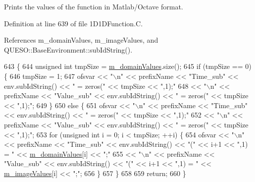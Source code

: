 Prints the values of the function in Matlab/\-Octave format. 



Definition at line 639 of file 1\-D1\-D\-Function.\-C.



References m\-\_\-domain\-Values, m\-\_\-image\-Values, and Q\-U\-E\-S\-O\-::\-Base\-Environment\-::sub\-Id\-String().


\begin{DoxyCode}
643 \{
644   \textcolor{keywordtype}{unsigned} \textcolor{keywordtype}{int} tmpSize = \hyperlink{class_q_u_e_s_o_1_1_sampled1_d1_d_function_a6985db1a50a72a3fb1377645ac6cd944}{m\_domainValues}.size();
645   \textcolor{keywordflow}{if} (tmpSize == 0) \{
646     tmpSize = 1;
647     ofsvar << \textcolor{stringliteral}{"\(\backslash\)n"} << prefixName << \textcolor{stringliteral}{"Time\_sub"} << env.subIdString() << \textcolor{stringliteral}{" = zeros("}  << tmpSize << \textcolor{stringliteral}{",1);"}
648            << \textcolor{stringliteral}{"\(\backslash\)n"} << prefixName << \textcolor{stringliteral}{"Value\_sub"} << env.subIdString() << \textcolor{stringliteral}{" = zeros("} << tmpSize << \textcolor{stringliteral}{",1);"};
649   \}
650   \textcolor{keywordflow}{else} \{
651     ofsvar << \textcolor{stringliteral}{"\(\backslash\)n"} << prefixName << \textcolor{stringliteral}{"Time\_sub"} << env.subIdString() << \textcolor{stringliteral}{" = zeros("}  << tmpSize << \textcolor{stringliteral}{",1);"}
652            << \textcolor{stringliteral}{"\(\backslash\)n"} << prefixName << \textcolor{stringliteral}{"Value\_sub"} << env.subIdString() << \textcolor{stringliteral}{" = zeros("} << tmpSize << \textcolor{stringliteral}{",1);"};
653     \textcolor{keywordflow}{for} (\textcolor{keywordtype}{unsigned} \textcolor{keywordtype}{int} i = 0; i < tmpSize; ++i) \{
654       ofsvar << \textcolor{stringliteral}{"\(\backslash\)n"} << prefixName << \textcolor{stringliteral}{"Time\_sub"} << env.subIdString() << \textcolor{stringliteral}{"("}  << i+1 << \textcolor{stringliteral}{",1) = "} << 
      \hyperlink{class_q_u_e_s_o_1_1_sampled1_d1_d_function_a6985db1a50a72a3fb1377645ac6cd944}{m\_domainValues}[i] << \textcolor{stringliteral}{";"}
655              << \textcolor{stringliteral}{"\(\backslash\)n"} << prefixName << \textcolor{stringliteral}{"Value\_sub"} << env.subIdString() << \textcolor{stringliteral}{"("} << i+1 << \textcolor{stringliteral}{",1) = "} << 
      \hyperlink{class_q_u_e_s_o_1_1_sampled1_d1_d_function_a5569dd39ba1eb7183b608b59e4919a6f}{m\_imageValues}[i]  << \textcolor{stringliteral}{";"};
656     \}
657   \}
658 
659   \textcolor{keywordflow}{return};
660 \}
\end{DoxyCode}
